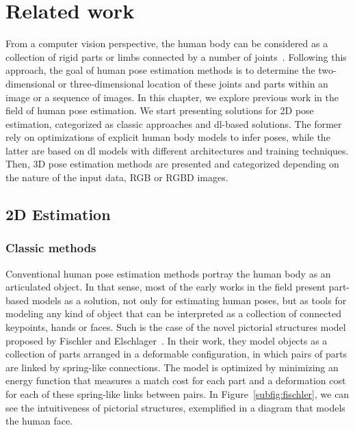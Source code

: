 \chapter{Related work}\label{ch:related_work}
From a computer vision perspective, the human body can be considered as a collection of rigid parts or limbs connected by a number of joints~\cite{Gong2016-kd}. Following this approach, the goal of human pose estimation methods is to determine the two-dimensional or three-dimensional location of these joints and parts within an image or a sequence of images. In this chapter, we explore previous work in the field of human pose estimation. We start presenting solutions for 2D pose estimation, categorized as classic approaches and \gls{dl}-based solutions. The former rely on optimizations of explicit human body models to infer poses, while the latter are based on \gls{dl} models with different architectures and training techniques. Then, 3D pose estimation methods are presented and categorized depending on the nature of the input data, \ie RGB or RGBD images.

\section{2D Estimation}\label{sec:2d_estimation}
\subsection{Classic methods}\label{subsec:classic_2d_estimation}
Conventional human pose estimation methods portray the human body as an articulated object. In that sense, most of the early works in the field present part-based models as a solution, not only for estimating human poses, but as tools for modeling any kind of object that can be interpreted as a collection of connected keypoints, \eg hands or faces. Such is the case of the novel pictorial structures model proposed by Fischler and Elschlager~\cite{Fischler1973-bi}. In their work, they model objects as a collection of parts arranged in a deformable configuration, in which pairs of parts are linked by spring-like connections. The model is optimized by minimizing an energy function that measures a match cost for each part and a deformation cost for each of these spring-like links between pairs. In Figure~\ref{subfig:fischler}, we can see the intuitiveness of pictorial structures, exemplified in a diagram that models the human face.

